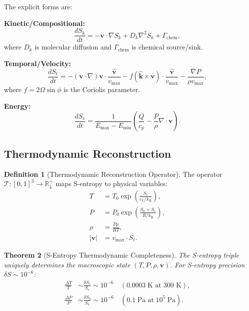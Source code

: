 \documentclass[twocolumn,10pt]{article}
\newtheorem{theorem}{Theorem}[section]
\theoremstyle{definition}
\newtheorem{definition}[theorem]{Definition}
\newcommand{\kB}{k_{\mathrm{B}}}
\newcommand{\Sk}{S_k}
\newcommand{\St}{S_t}
\newcommand{\Se}{S_e}
\newcommand{\R}{\mathbb{R}}
\begin{document}
The explicit forms are:

\textbf{Kinetic/Compositional:}
\begin{equation}\label{eq:Sk_evolution}
    \frac{d\Sk}{dt} = -\mathbf{v}\cdot\nabla\Sk + D_k\nabla^2\Sk + \Gamma_{\mathrm{chem}},
\end{equation}
where $D_k$ is molecular diffusion and $\Gamma_{\mathrm{chem}}$ is chemical source/sink.

\textbf{Temporal/Velocity:}
\begin{equation}\label{eq:St_evolution}
    \frac{d\St}{dt} = -(\mathbf{v}\cdot\nabla)\mathbf{v}\cdot\frac{\hat{\mathbf{v}}}{v_{\max}} - f(\hat{\mathbf{k}}\times\mathbf{v})\cdot\frac{\hat{\mathbf{v}}}{v_{\max}} - \frac{\nabla P}{\rho v_{\max}},
\end{equation}
where $f = 2\Omega\sin\phi$ is the Coriolis parameter.

\textbf{Energy:}
\begin{equation}\label{eq:Se_evolution}
    \frac{d\Se}{dt} = \frac{1}{E_{\max} - E_{\min}}\left(\frac{Q}{c_p} - \frac{P}{\rho}\nabla\cdot\mathbf{v}\right).
\end{equation}

\subsection{Thermodynamic Reconstruction}

\begin{definition}[Thermodynamic Reconstruction Operator]\label{def:thermo_recon}
The operator $\mathcal{T}: [0,1]^3 \to \R^+_4$ maps S-entropy to physical variables:
\begin{align}
    T &= T_0\exp\left(\frac{\Se}{c_V/\kB}\right), \label{eq:temp_recon} \\
    P &= P_0\exp\left(\frac{\Sk + \Se}{R/\kB}\right), \label{eq:pres_recon} \\
    \rho &= \frac{P\mu}{RT}, \label{eq:dens_recon} \\
    |\mathbf{v}| &= v_{\max}\cdot\St. \label{eq:vel_recon}
\end{align}
\end{definition}

\begin{theorem}[S-Entropy Thermodynamic Completeness]\label{thm:thermo_complete}
The S-entropy triple uniquely determines the macroscopic state $(T, P, \rho, \mathbf{v})$. For S-entropy precision $\delta S \sim 10^{-6}$:
\begin{align}
    \frac{\Delta T}{T} &\sim \frac{\delta\Se}{\Se} \sim 10^{-6} \quad (0.0003\;\text{K at 300 K}), \\
    \frac{\Delta P}{P} &\sim \frac{\delta\Sk}{\Sk} \sim 10^{-6} \quad (0.1\;\text{Pa at}\;10^5\;\text{Pa}).
\end{align}
\end{theorem}
\end{document}
